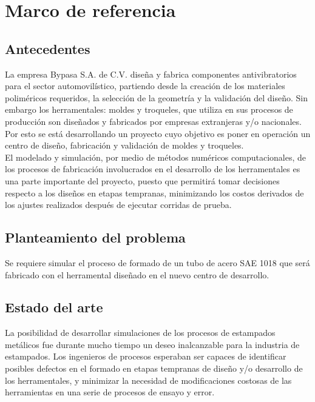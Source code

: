 \chapter{Marco de referencia}

\section{Antecedentes}

La empresa Bypasa S.A. de C.V. diseña y fabrica componentes antivibratorios para el sector 
automovilístico, partiendo desde la creación de los materiales poliméricos requeridos, la 
selección de la geometría y la validación del diseño. Sin embargo los herramentales: moldes y troqueles,  
que utiliza en sus procesos de producción son diseñados y fabricados por empresas extranjeras y/o 
nacionales. Por esto se está desarrollando un proyecto cuyo objetivo es poner en operación un centro 
de diseño, fabricación y validación de moldes y troqueles.\\

El modelado y simulación, por medio de métodos numéricos computacionales, de los procesos de fabricación 
involucrados en el desarrollo de los herramentales es una parte importante del proyecto, puesto que 
permitirá tomar decisiones respecto a los diseños en etapas tempranas, minimizando los costos derivados de 
los ajustes realizados después de ejecutar corridas de prueba.

\section{Planteamiento del problema}

Se requiere simular el proceso de formado de un tubo de acero SAE 1018 que será fabricado con el herramental 
diseñado en el nuevo centro de desarrollo. 

\section{Estado del arte}

La posibilidad de desarrollar simulaciones de los procesos de estampados metálicos fue durante mucho tiempo 
un deseo inalcanzable para la industria de estampados. Los ingenieros de procesos esperaban ser capaces de 
identificar posibles defectos en el formado en etapas tempranas de diseño y/o desarrollo de los herramentales, 
y minimizar la necesidad de modificaciones costosas de las herramientas en una serie de procesos de ensayo y error. \\

